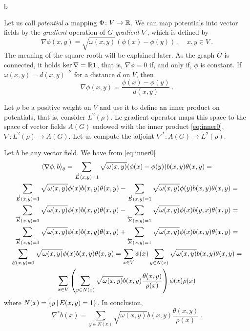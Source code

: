b\documentclass[12pt,a4paper]{amsart}
\begin{document}
Let us call \emph{potential} a mapping $\Phi \colon V \to \mathbb{R}$. We
can map potentials into vector fields by the \emph{gradient} operation
of \emph{$G$-gradient} $\nabla$, which is defined by
\begin{equation*}
  \nabla \phi(x,y) = \sqrt {\omega(x,y)} (\phi(x) - \phi(y)) \ , \quad
  x,y \in V \ .
\end{equation*}
The meaning of the square rooth will be explained later. As the graph
$G$ is connected, it holds $\ker \nabla = \mathbb{R} \bm 1$, that is,
$\nabla\phi=0$ if, and only if, $\phi$ is constant. If
$\omega(x,y) = d(x,y)^{-2}$ for a distance $d$ on $V$, then
\begin{equation*}
  \nabla \phi (x,y)=\frac{\phi(x) - \phi(y)}{d(x,y)} \ .
\end{equation*}

Let $\rho$ be a positive weight on $V$ and use it to define an inner
product on potentials, that is, consider $L^2(\rho)$. Le gradient
operator maps this space to the space of vector fields $A(G)$ endowed
with the inner product \eqref{eq:inner0}, $\nabla \colon L^2(\rho) \to A(G)$.
Let us compute the adjoint $\nabla^* \colon A(G) \to L^2(\rho)$.

Let $b$ be any vector field. We have from \cref{eq:inner0}
\begin{multline*}
  \left\langle\nabla \phi,b\right\rangle_{\theta} = \sum_{\overrightarrow E(x,y)=1}
  \sqrt{\omega(x,y)}  (\phi(x) - \phi(y)) b(x,y) \theta(x,y) = \\
  \sum_{\overrightarrow E(x,y)=1} \sqrt{\omega(x,y)} \phi(x) b(x,y)
  \theta(x,y) - \sum_{\overrightarrow E(x,y)=1}
  \sqrt{\omega(x,y)}  \phi(y) b(x,y) \theta(x,y) = \\
  \sum_{\overrightarrow E(x,y)=1} \sqrt{\omega(x,y)} \phi(x) b(x,y)
  \theta(x,y) - \sum_{\overleftarrow E(x,y)=1}
  \sqrt{\omega(x,y)}  \phi(x) b(y,x) \theta(x,y) = \\
  \sum_{\overrightarrow E(x,y)=1} \sqrt{\omega(x,y)} \phi(x) b(x,y)
  \theta(x,y) + \sum_{\overleftarrow E(x,y)=1}
  \sqrt{\omega(x,y)}  \phi(x) b(x,y) \theta(x,y) = \\
  \sum_{E(x,y)=1} \sqrt{\omega(x,y)}  \phi(x) b(x,y) \theta(x,y) = 
  \sum_{x \in V} \phi(x) \sum_{y \in N(x)}
  \sqrt{\omega(x,y)}  b(x,y) \theta(x,y) = \\
  \sum_{x \in V} \left(\sum_{y \in N(x)}
  \sqrt{\omega(x,y)}  b(x,y) \frac{\theta(x,y)}{\rho(x)} \right) \phi(x) \rho(x)
\end{multline*}
where $N(x) = \left\{y \, \middle| \, E(x,y)=1 \right\}$. In conclusion,
\begin{equation*}
  \nabla^* b(x) = \sum_{y \in N(x)}
  \sqrt{\omega(x,y)}  b(x,y) \frac{\theta(x,y)}{\rho(x)} \ .
\end{equation*}
\end{document}

